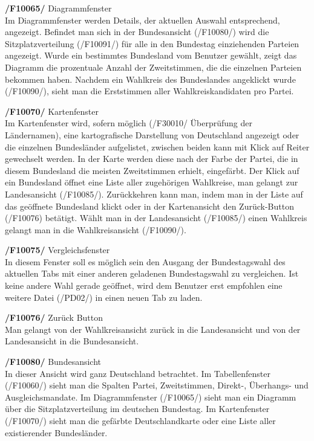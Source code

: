 \documentclass[10pt,a4paper]{article}
\begin{document}
\begin{list}{\quad}{}
	\item \textbf{/F10065/} Diagrammfenster \hfill \\
	Im Diagrammfenster werden Details, der aktuellen Auswahl entsprechend, angezeigt. Befindet man sich in der Bundesansicht (/F10080/) wird die Sitzplatzverteilung (/F10091/) für alle in den Bundestag einziehenden Parteien angezeigt. Wurde ein bestimmtes Bundesland vom Benutzer gewählt, zeigt das Diagramm die prozentuale Anzahl der Zweitstimmen, die die einzelnen Parteien bekommen haben. Nachdem ein Wahlkreis des Bundeslandes angeklickt wurde (/F10090/), sieht man die Erststimmen aller Wahlkreiskandidaten pro Partei. \hfill \\
	\item \textbf{/F10070/} Kartenfenster \hfill \\
	Im Kartenfenster wird, sofern möglich (/F30010/ Überprüfung der Ländernamen), eine kartografische Darstellung von Deutschland angezeigt oder die einzelnen Bundesländer aufgelistet, zwischen beiden kann mit Klick auf Reiter gewechselt werden. In der Karte werden diese nach der Farbe der Partei, die in diesem Bundesland die meisten Zweitstimmen erhielt, eingefärbt. Der Klick auf ein Bundesland öffnet eine Liste aller zugehörigen Wahlkreise, man gelangt zur Landesansicht (/F10085/). Zurückkehren kann man, indem man in der Liste auf das geöffnete Bundesland klickt oder in der Kartenansicht den Zurück-Button (/F10076) betätigt. Wählt man in der Landesansicht (/F10085/) einen Wahlkreis gelangt man in die Wahlkreisansicht (/F10090/). \hfill \\
	\item \textbf{/F10075/} Vergleichsfenster \hfill \\
	In diesem Fenster soll es möglich sein den Ausgang der Bundestagswahl des aktuellen Tabs mit einer anderen geladenen Bundestagswahl zu vergleichen. Ist keine andere Wahl gerade geöffnet, wird dem Benutzer erst empfohlen eine weitere Datei (/PD02/) in einen neuen Tab zu laden. \hfill \\
	\item \textbf{/F10076/} Zurück Button\hfill \\
	Man gelangt von der Wahlkreisansicht zurück in die Landesansicht und von der Landesansicht in die Bundesansicht. \hfill \\
	\item \textbf{/F10080/} Bundesansicht \hfill \\
	In dieser Ansicht wird ganz Deutschland betrachtet. Im Tabellenfenster (/F10060/) sieht man die Spalten Partei, Zweitstimmen, Direkt-, Überhangs- und Ausgleichsmandate. Im Diagrammfenster (/F10065/) sieht man ein Diagramm über die Sitzplatzverteilung im deutschen Bundestag. Im Kartenfenster (/F10070/) sieht man die gefärbte Deutschlandkarte oder eine Liste aller existierender Bundesländer. \hfill \\

\end{list}
\end{document}
